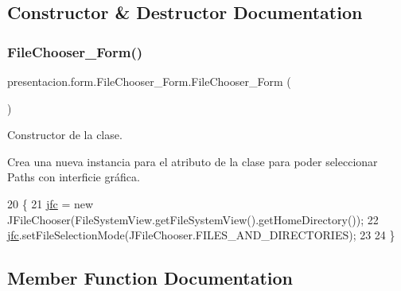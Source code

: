 \subsection{Constructor \& Destructor Documentation}
\mbox{\label{classpresentacion_1_1form_1_1FileChooser__Form_abcd4d671f55d23cf9e0f2488a80b62cb}} 
\subsubsection{\texorpdfstring{File\+Chooser\+\_\+\+Form()}{FileChooser\_Form()}}
{\footnotesize\ttfamily presentacion.\+form.\+File\+Chooser\+\_\+\+Form.\+File\+Chooser\+\_\+\+Form (\begin{DoxyParamCaption}{ }\end{DoxyParamCaption})\hspace{0.3cm}{\ttfamily [inline]}}



Constructor de la clase. 

Crea una nueva instancia para el atributo de la clase para poder seleccionar Path\textquotesingle{}s con interficie gráfica. 
\begin{DoxyCode}
20                               \{
21         \hyperlink{classpresentacion_1_1form_1_1FileChooser__Form_a6fc55a912c266f0379aab09209dd858c}{jfc} = \textcolor{keyword}{new} JFileChooser(FileSystemView.getFileSystemView().getHomeDirectory());
22         \hyperlink{classpresentacion_1_1form_1_1FileChooser__Form_a6fc55a912c266f0379aab09209dd858c}{jfc}.setFileSelectionMode(JFileChooser.FILES\_AND\_DIRECTORIES);
23 
24     \}
\end{DoxyCode}


\subsection{Member Function Documentation}
\mbox{\label{classpresentacion_1_1form_1_1FileChooser__Form_ab96ac21c9d7b860368a206f36f6ec4fb}} 
